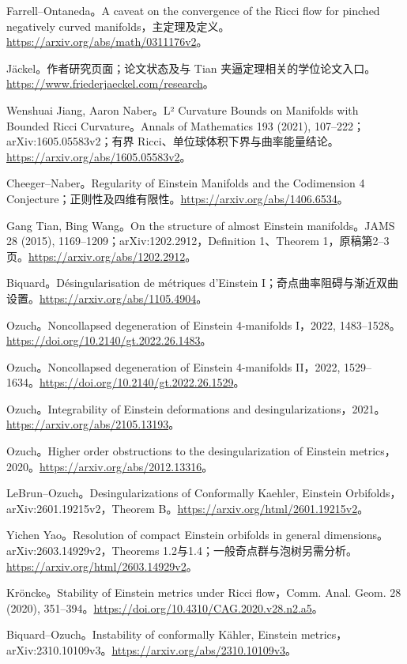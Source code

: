 \documentclass[11pt,a4paper]{article}
\theoremstyle{definition}
\begin{document}
\begin{enumerate}[label={[\arabic*]},leftmargin=2.2em,itemsep=0.55em]
\item Farrell--Ontaneda。A caveat on the convergence of the Ricci flow for pinched negatively curved manifolds，主定理及定义。\url{https://arxiv.org/abs/math/0311176v2}。
\item Jäckel。作者研究页面；论文状态及与 Tian 夹逼定理相关的学位论文入口。\url{https://www.friederjaeckel.com/research}。
\item Wenshuai Jiang, Aaron Naber。L² Curvature Bounds on Manifolds with Bounded Ricci Curvature。Annals of Mathematics 193 (2021), 107--222；arXiv:1605.05583v2；有界 Ricci、单位球体积下界与曲率能量结论。\url{https://arxiv.org/abs/1605.05583v2}。
\item Cheeger--Naber。Regularity of Einstein Manifolds and the Codimension 4 Conjecture；正则性及四维有限性。\url{https://arxiv.org/abs/1406.6534}。
\item Gang Tian, Bing Wang。On the structure of almost Einstein manifolds。JAMS 28 (2015), 1169--1209；arXiv:1202.2912，Definition 1、Theorem 1，原稿第2--3页。\url{https://arxiv.org/abs/1202.2912}。
\item Biquard。Désingularisation de métriques d'Einstein I；奇点曲率阻碍与渐近双曲设置。\url{https://arxiv.org/abs/1105.4904}。
\item Ozuch。Noncollapsed degeneration of Einstein 4-manifolds I，2022, 1483--1528。\url{https://doi.org/10.2140/gt.2022.26.1483}。
\item Ozuch。Noncollapsed degeneration of Einstein 4-manifolds II，2022, 1529--1634。\url{https://doi.org/10.2140/gt.2022.26.1529}。
\item Ozuch。Integrability of Einstein deformations and desingularizations，2021。\url{https://arxiv.org/abs/2105.13193}。
\item Ozuch。Higher order obstructions to the desingularization of Einstein metrics，2020。\url{https://arxiv.org/abs/2012.13316}。
\item LeBrun--Ozuch。Desingularizations of Conformally Kaehler, Einstein Orbifolds，arXiv:2601.19215v2，Theorem B。\url{https://arxiv.org/html/2601.19215v2}。
\item Yichen Yao。Resolution of compact Einstein orbifolds in general dimensions。arXiv:2603.14929v2，Theorems 1.2与1.4；一般奇点群与泡树另需分析。\url{https://arxiv.org/html/2603.14929v2}。
\item Kröncke。Stability of Einstein metrics under Ricci flow，Comm. Anal. Geom. 28 (2020), 351--394。\url{https://doi.org/10.4310/CAG.2020.v28.n2.a5}。
\item Biquard--Ozuch。Instability of conformally Kähler, Einstein metrics，arXiv:2310.10109v3。\url{https://arxiv.org/abs/2310.10109v3}。

\end{enumerate}
\end{document}
